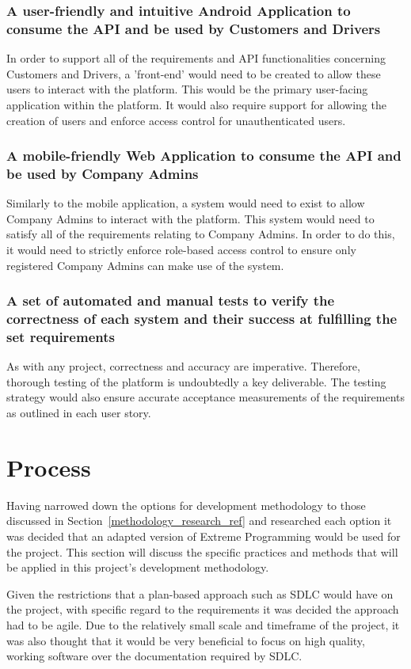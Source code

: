 \subsubsection{A user-friendly and intuitive Android Application to consume the API and be used by Customers and Drivers}
In order to support all of the requirements and API functionalities concerning Customers and Drivers, a 'front-end' would need to be created to allow these users to interact with the platform. This would be the primary user-facing application within the platform. It would also require support for allowing the creation of users and enforce access control for unauthenticated users.

\subsubsection{A mobile-friendly Web Application to consume the API and be used by Company Admins}
Similarly to the mobile application, a system would need to exist to allow Company Admins to interact with the platform. This system would need to satisfy all of the requirements relating to Company Admins. In order to do this, it would need to strictly enforce role-based access control to ensure only registered Company Admins can make use of the system.

\subsubsection{A set of automated and manual tests to verify the correctness of each system and their success at fulfilling the set requirements}
As with any project, correctness and accuracy are imperative. Therefore, thorough testing of the platform is undoubtedly a key deliverable. The testing strategy would also ensure accurate acceptance measurements of the requirements as outlined in each user story.

\section{Process}
Having narrowed down the options for development methodology to those discussed in Section~\ref{methodology_research_ref} and researched each option it was decided that an adapted version of Extreme Programming would be used for the project. This section will discuss the specific practices and methods that will be applied in this project's development methodology.

Given the restrictions that a plan-based approach such as SDLC  would have on the project, with specific regard to the requirements it was decided the approach had to be agile. Due to the relatively small scale and timeframe of the project, it was also thought that it would be very beneficial to focus on high quality, working software over the documentation required by SDLC.

